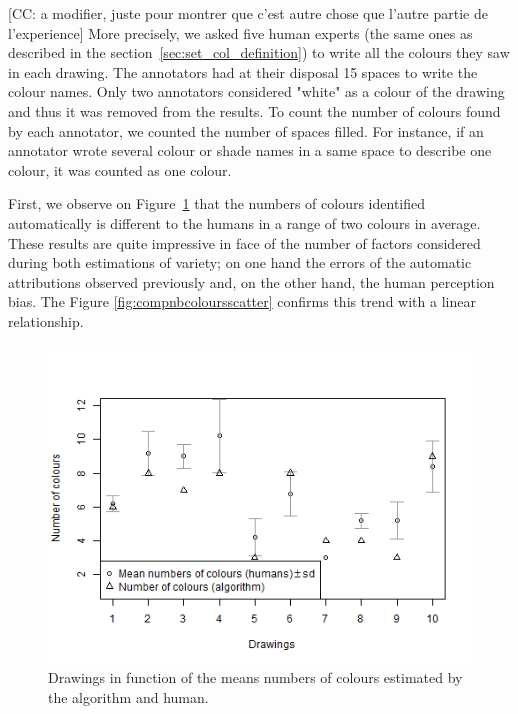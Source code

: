 \documentclass[11pt,a4paper]{article}
\begin{document}
{\color{red}[CC: a modifier, juste pour montrer que c'est autre chose que l'autre partie de l'experience]}
More precisely, we asked five human experts (the same ones as described in the section~\ref{sec:set_col_definition}) to write all the colours they saw in each drawing.
The annotators had at their disposal 15 spaces to write the colour names.
Only two annotators considered "white" as a colour of the drawing and thus it was removed from the results.
To count the number of colours found by each annotator, we counted the number of spaces filled. 
For instance, if an annotator wrote several colour or shade names in a same space to describe one colour, it was counted as one colour.


First, we observe on Figure~\ref{fig:compnbcolourssd} that the numbers of colours identified automatically is different to the humans in a range of two colours in average. 
These results are quite impressive in face of the number of factors considered during both estimations of variety; on one hand the errors of the automatic attributions observed previously and, on the other hand, the human perception bias. 
The Figure \ref{fig:compnbcoloursscatter} confirms this trend with a linear relationship.

\begin{figure}[h!]
	\centering
	\includegraphics[width=\linewidth]{figures/comp_nb_colours_sd.png}
	\caption{Drawings in function of the means numbers of colours estimated by the algorithm and human.}
	\label{fig:compnbcolourssd}
\end{figure}
\end{document}
